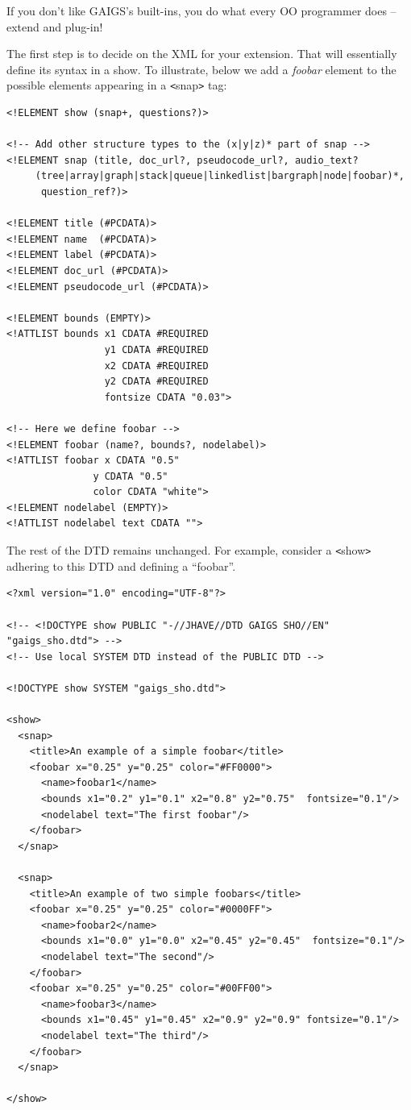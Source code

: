 \documentclass[11pt,letterpaper]{book}
\begin{document}
If you don't like GAIGS's built-ins, you do what every OO programmer
does -- extend and plug-in!

The first step is to decide on the XML for your extension.  That will
essentially define its syntax in a show.  To illustrate, below we add
a \textit{foobar} element to the possible elements appearing in a
\verb'<'snap\verb'>' tag:

\footnotesize \begin{verbatim}
<!ELEMENT show (snap+, questions?)>

<!-- Add other structure types to the (x|y|z)* part of snap -->
<!ELEMENT snap (title, doc_url?, pseudocode_url?, audio_text?
     (tree|array|graph|stack|queue|linkedlist|bargraph|node|foobar)*,
      question_ref?)>

<!ELEMENT title (#PCDATA)>
<!ELEMENT name  (#PCDATA)>
<!ELEMENT label (#PCDATA)>
<!ELEMENT doc_url (#PCDATA)>
<!ELEMENT pseudocode_url (#PCDATA)>

<!ELEMENT bounds (EMPTY)>
<!ATTLIST bounds x1 CDATA #REQUIRED
                 y1 CDATA #REQUIRED
                 x2 CDATA #REQUIRED
                 y2 CDATA #REQUIRED
                 fontsize CDATA "0.03">

<!-- Here we define foobar -->
<!ELEMENT foobar (name?, bounds?, nodelabel)>
<!ATTLIST foobar x CDATA "0.5"
               y CDATA "0.5"
               color CDATA "white">
<!ELEMENT nodelabel (EMPTY)>
<!ATTLIST nodelabel text CDATA "">
\end{verbatim} \normalsize

The rest of the DTD remains unchanged.
For example, consider a \verb'<'show\verb'>' adhering to this DTD and defining a ``foobar''.

\footnotesize \begin{verbatim}  
<?xml version="1.0" encoding="UTF-8"?>

<!-- <!DOCTYPE show PUBLIC "-//JHAVE//DTD GAIGS SHO//EN" "gaigs_sho.dtd"> --> 
<!-- Use local SYSTEM DTD instead of the PUBLIC DTD -->

<!DOCTYPE show SYSTEM "gaigs_sho.dtd">  

<show>
  <snap>
    <title>An example of a simple foobar</title>
    <foobar x="0.25" y="0.25" color="#FF0000">
      <name>foobar1</name>
      <bounds x1="0.2" y1="0.1" x2="0.8" y2="0.75"  fontsize="0.1"/>
      <nodelabel text="The first foobar"/>
    </foobar>
  </snap>

  <snap>
    <title>An example of two simple foobars</title>
    <foobar x="0.25" y="0.25" color="#0000FF">
      <name>foobar2</name>
      <bounds x1="0.0" y1="0.0" x2="0.45" y2="0.45"  fontsize="0.1"/>
      <nodelabel text="The second"/>
    </foobar>
    <foobar x="0.25" y="0.25" color="#00FF00">
      <name>foobar3</name>
      <bounds x1="0.45" y1="0.45" x2="0.9" y2="0.9" fontsize="0.1"/>
      <nodelabel text="The third"/>
    </foobar>
  </snap>

</show>
\end{verbatim}
\normalsize
  
\end{document}
